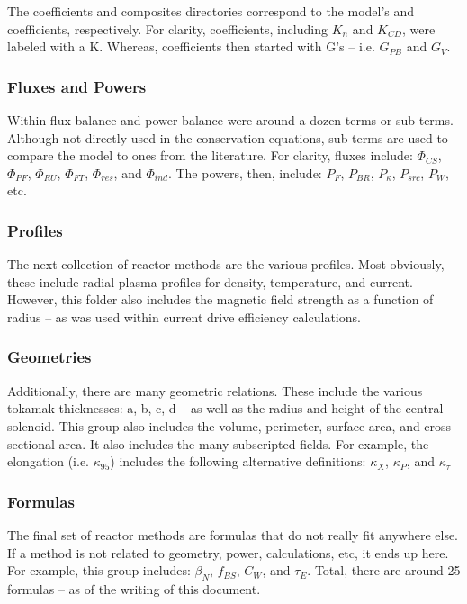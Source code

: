 The coefficients and composites directories correspond to the model's  and  coefficients, respectively. For clarity,  coefficients, including $K_n$ and $K_{CD}$, were labeled with a K. Whereas,  coefficients then started with G's -- i.e. $G_{PB}$ and $G_V$.

\subsubsection{Fluxes and Powers}

Within flux balance and power balance were around a dozen terms or sub-terms. Although not directly used in the conservation equations, sub-terms are used to compare the model to ones from the literature. For clarity, fluxes include: $\Phi_{CS}$, $\Phi_{PF}$, $\Phi_{RU}$, $\Phi_{FT}$, $\Phi_{res}$, and $\Phi_{ind}$. The powers, then, include: $P_F$, $P_{BR}$, $P_\kappa$, $P_{src}$, $P_W$, etc. 

\subsubsection{Profiles}

The next collection of reactor methods are the various profiles. Most obviously, these include radial plasma profiles for density, temperature, and current. However, this folder also includes the magnetic field strength as a function of radius -- as was used within current drive efficiency calculations.

\subsubsection{Geometries}

Additionally, there are many geometric relations. These include the various tokamak thicknesses: a, b, c, d -- as well as the radius and height of the central solenoid. This group also includes the volume, perimeter, surface area, and cross-sectional area. It also includes the many subscripted fields. For example, the elongation (i.e. $\kappa_{95}$) includes the following alternative definitions: $\kappa_X$, $\kappa_P$, and $\kappa_\tau$

\subsubsection{Formulas}

The final set of reactor methods are formulas that do not really fit anywhere else. If a method is not related to geometry, power, calculations, etc, it ends up here. For example, this group includes: $\beta_N$, $f_{BS}$, $C_W$, and $\tau_E$. Total, there are around 25 formulas -- as of the writing of this document.

